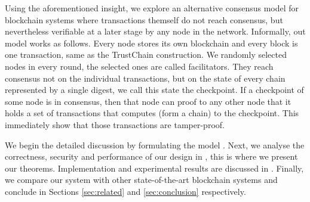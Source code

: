 Using the aforementioned insight,
we explore an alternative consensus model for blockchain systems where transactions themself do not reach consensus,
but nevertheless verifiable at a later stage by any node in the network.
Informally, out model works as follows.
Every node stores its own blockchain and every block is one transaction, same as the TrustChain construction.
We randomly selected nodes in every round, the selected ones are called facilitators.
They reach consensus not on the individual transactions,
but on the state of every chain represented by a single digest, we call this state the checkpoint.
If a checkpoint of some node is in consensus, 
then that node can proof to any other node that it holds a set of transactions that computes (form a chain) to the checkpoint.
This immediately show that those transactions are tamper-proof.

We begin the detailed discussion by formulating the model . 
Next, we analyse the correctness, security and performance of our design in ,
this is where we present our theorems.
Implementation and experimental results are discussed in .
Finally, we compare our system with other state-of-the-art blockchain systems and conclude in Sections \ref{sec:related} and \ref{sec:conclusion} respectively.


